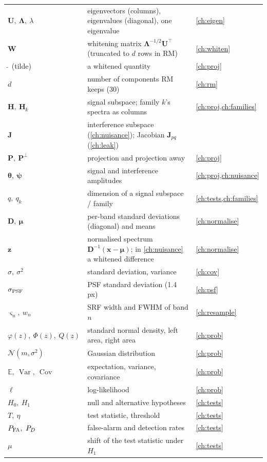 \documentclass[11pt,a4paper,oneside,openany]{book}
\newcommand{\B}[1]{{\symbf{#1}}}
\newcommand{\B}[1]{{\bm{#1}}}
\newcommand{\T}{^{\top}}
\newcommand{\E}{\mathbb{E}}
\newcommand{\Var}{\operatorname{Var}}
\newcommand{\Cov}{\operatorname{Cov}}
\newcommand{\vx}{\B{x}}
\newcommand{\vz}{\B{z}}
\newcommand{\vmu}{\B{\mu}}
\newcommand{\vtheta}{\B{\theta}}
\newcommand{\vpsi}{\B{\psi}}
\newcommand{\mW}{\B{W}}
\newcommand{\mU}{\B{U}}
\newcommand{\mH}{\B{H}}
\newcommand{\mJ}{\B{J}}
\newcommand{\mP}{\B{P}}
\newcommand{\mD}{\B{D}}
\newcommand{\mLam}{\B{\Lambda}}
\begin{document}
{\begin{longtable}{@{}p{}p{}p{}@{}}
$\mU,\ \mLam,\ \lambda$ & eigenvectors (columns), eigenvalues (diagonal), one eigenvalue & \cref{ch:eigen}\\
$\mW$ & whitening matrix $\mLam^{-1/2}\mU\T$ (truncated to $d$ rows in RM) & \cref{ch:whiten}\\
$\tilde{\ }$ (tilde) & a whitened quantity & \cref{ch:proj}\\
$d$ & number of components RM keeps (30) & \cref{ch:rm}\\
$\mH,\ \mH_k$ & signal subspace; family $k$'s spectra as columns & \cref{ch:proj,ch:families}\\
$\mJ$ & interference subspace (\cref{ch:nuisance}); Jacobian $\mJ_{pq}$ (\cref{ch:leak}) & \\
$\mP,\ \mP^\perp$ & projection and projection away & \cref{ch:proj}\\
$\vtheta,\ \vpsi$ & signal and interference amplitudes & \cref{ch:proj,ch:nuisance}\\
$q,\ q_k$ & dimension of a signal subspace / family & \cref{ch:tests,ch:families}\\
$\mD,\ \vmu$ & per-band standard deviations (diagonal) and means & \cref{ch:normalise}\\
$\vz$ & normalised spectrum $\mD^{-1}(\vx-\vmu)$; in \cref{ch:nuisance} a whitened difference & \cref{ch:normalise}\\
$\sigma,\ \sigma^2$ & standard deviation, variance & \cref{ch:cov}\\
$\sigma_{\rm PSF}$ & PSF standard deviation (1.4 px) & \cref{ch:psf}\\
$\varsigma_n,\ w_n$ & SRF width and FWHM of band $n$ & \cref{ch:resample}\\
$\varphi(z),\ \Phi(z),\ Q(z)$ & standard normal density, left area, right area & \cref{ch:prob}\\
$\mathcal N(m,\sigma^2)$ & Gaussian distribution & \cref{ch:prob}\\
$\E,\ \Var,\ \Cov$ & expectation, variance, covariance & \cref{ch:prob}\\
$\ell$ & log-likelihood & \cref{ch:prob}\\
$H_0,\ H_1$ & null and alternative hypotheses & \cref{ch:tests}\\
$T,\ \eta$ & test statistic, threshold & \cref{ch:tests}\\
$P_{\rm FA},\ P_D$ & false-alarm and detection rates & \cref{ch:tests}\\
$\mu$ & shift of the test statistic under $H_1$ & \cref{ch:tests}\\

\end{longtable}}
\end{document}
